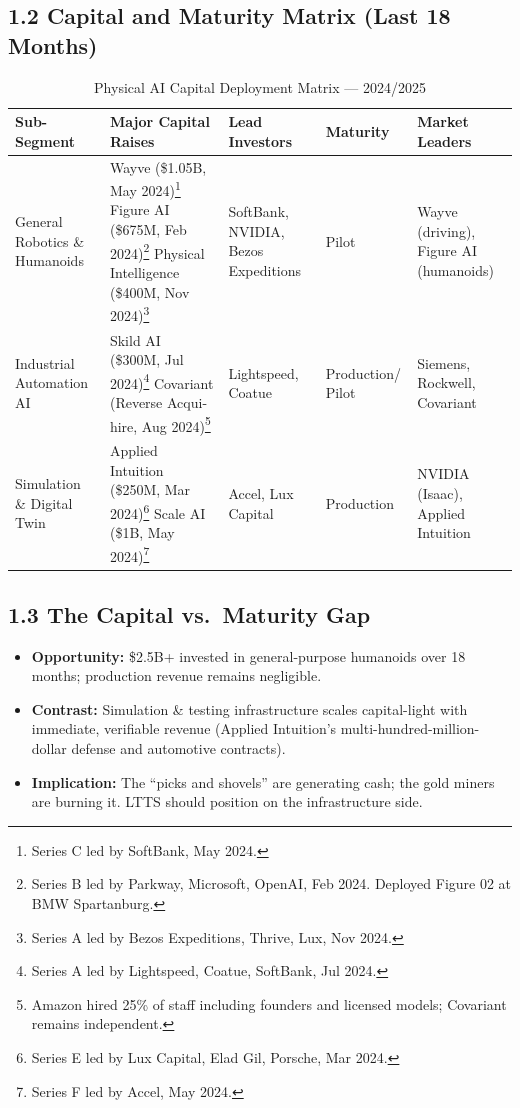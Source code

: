 \documentclass[11pt,a4paper]{article}
\begin{document}
\subsection{1.2 Capital and Maturity Matrix (Last 18 Months)}
\begin{table}[h!]
\centering
\small
\begin{tabularx}{\textwidth}{@{}l X l l X@{}}
\toprule
\textbf{Sub-Segment} & \textbf{Major Capital Raises} & \textbf{Lead Investors} & \textbf{Maturity} & \textbf{Market Leaders} \\
\midrule
General Robotics \& Humanoids &
    Wayve (\$1.05B, May 2024)\footnote{Series C led by SoftBank, May 2024.} \newline
    Figure AI (\$675M, Feb 2024)\footnote{Series B led by Parkway, Microsoft, OpenAI, Feb 2024. Deployed Figure 02 at BMW Spartanburg.} \newline
    Physical Intelligence (\$400M, Nov 2024)\footnote{Series A led by Bezos Expeditions, Thrive, Lux, Nov 2024.} &
    SoftBank, NVIDIA, Bezos Expeditions &
    Pilot &
    Wayve (driving), Figure AI (humanoids) \\
\addlinespace
Industrial Automation AI &
    Skild AI (\$300M, Jul 2024)\footnote{Series A led by Lightspeed, Coatue, SoftBank, Jul 2024.} \newline
    Covariant (Reverse Acqui-hire, Aug 2024)\footnote{Amazon hired 25\% of staff including founders and licensed models; Covariant remains independent.} &
    Lightspeed, Coatue &
    Production/ Pilot &
    Siemens, Rockwell, Covariant \\
\addlinespace
Simulation \& Digital Twin &
    Applied Intuition (\$250M, Mar 2024)\footnote{Series E led by Lux Capital, Elad Gil, Porsche, Mar 2024.} \newline
    Scale AI (\$1B, May 2024)\footnote{Series F led by Accel, May 2024.} &
    Accel, Lux Capital &
    Production &
    NVIDIA (Isaac), Applied Intuition \\
\bottomrule
\end{tabularx}
\caption{Physical AI Capital Deployment Matrix — 2024/2025}
\end{table}

\subsection{1.3 The Capital vs.\ Maturity Gap}
\begin{itemize}
    \item \textbf{Opportunity:} \$2.5B+ invested in general-purpose humanoids over 18 months; production revenue remains negligible.
    \item \textbf{Contrast:} Simulation \& testing infrastructure scales capital-light with immediate, verifiable revenue (Applied Intuition's multi-hundred-million-dollar defense and automotive contracts).
    \item \textbf{Implication:} The ``picks and shovels'' are generating cash; the gold miners are burning it. LTTS should position on the infrastructure side.
\end{itemize}
\end{document}
